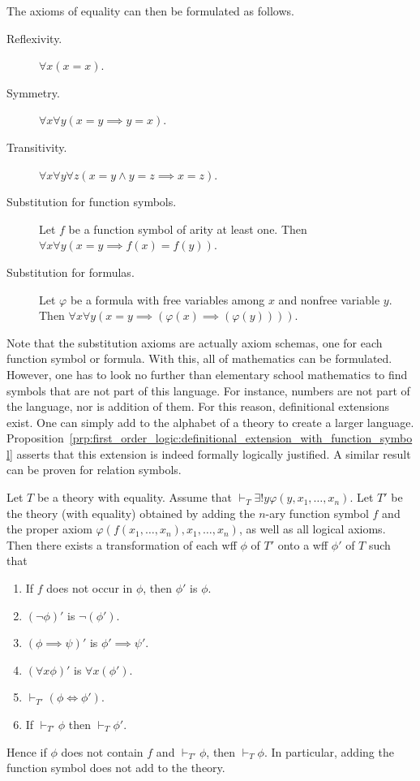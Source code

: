 \documentclass[../main.tex]{subfiles}
\begin{document}
The axioms of equality can then be formulated as follows.
\begin{description}
    \item[Reflexivity.] $\forall x(x=x)$.
    \item[Symmetry.] $\forall x\forall y(x=y\implies y=x)$.
    \item[Transitivity.] $\forall x\forall y\forall z(x=y\land y=z\implies x=z)$.
    \item[Substitution for function symbols.] Let $f$ be a function symbol of arity at least one. Then $\forall x\forall y(x=y\implies f(x)=f(y))$.
    \item[Substitution for formulas.] Let $\varphi$ be a formula with free variables among $x$ and nonfree variable $y$. Then $\forall x\forall y(x=y\implies(\varphi(x)\implies(\varphi(y))))$.
\end{description}
Note that the substitution axioms are actually axiom schemas, one for each function symbol or formula. With this, all of mathematics can be formulated. However, one has to look no further than elementary school mathematics to find symbols that are not part of this language. For instance, numbers are not part of the language, nor is addition of them. For this reason, definitional extensions exist. One can simply add to the alphabet of a theory to create a larger language. Proposition~\ref{prp:first_order_logic:definitional_extension_with_function_symbol} asserts that this extension is indeed formally logically justified. A similar result can be proven for relation symbols.
\begin{proposition}\label{prp:first_order_logic:definitional_extension_with_function_symbol}
    Let $T$ be a theory with equality. Assume that \linebreak$\vdash_T\exists!y\varphi(y,x_1,\dots,x_n)$. Let $T'$ be the theory (with equality) obtained by adding the $n$-ary function symbol $f$ and the proper axiom $\varphi(f(x_1,\dots,x_n),x_1,\dots,x_n)$, as well as all logical axioms. Then there exists a transformation of each wff $\phi$ of $T'$ onto a wff $\phi'$ of $T$ such that
    \begin{enumerate}
        \item If $f$ does not occur in $\phi$, then $\phi'$ is $\phi$.
        \item $(\lnot\phi)'$ is $\lnot(\phi')$.
        \item $(\phi\implies\psi)'$ is $\phi'\implies\psi'$.
        \item $(\forall x\phi)'$ is $\forall x(\phi')$.
        \item $\vdash_{T'}(\phi\iff\phi')$.
        \item If $\vdash_{T'}\phi$ then $\vdash_T\phi'$.
    \end{enumerate}
    Hence if $\phi$ does not contain $f$ and $\vdash_{T'}\phi$, then $\vdash_T\phi$. In particular, adding the function symbol does not add to the theory.
\end{proposition}
\end{document}
